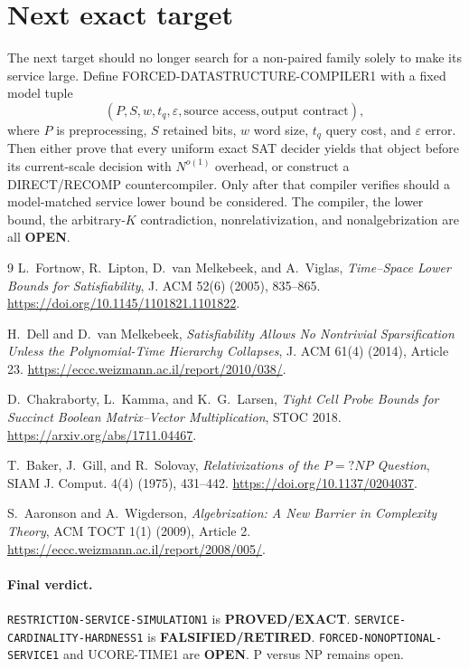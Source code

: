 \documentclass[11pt]{article}
\newcommand{\OPEN}{\textbf{OPEN}}
\newcommand{\EXACT}{\textbf{PROVED/EXACT}}
\newcommand{\RETIRED}{\textbf{FALSIFIED/RETIRED}}
\begin{document}
\section{Next exact target}

The next target should no longer search for a non-paired family solely to make
its service large.  Define \textsf{FORCED-DATASTRUCTURE-COMPILER1} with a fixed
model tuple
\[
(P,S,w,t_q,\varepsilon,\text{source access},\text{output contract}),       \tag{8}
\]
where $P$ is preprocessing, $S$ retained bits, $w$ word size, $t_q$
query cost, and $\varepsilon$ error.  Then either prove that every uniform
exact SAT decider yields that object before its current-scale decision with
$N^{o(1)}$ overhead, or construct a DIRECT/RECOMP countercompiler.  Only
after that compiler verifies should a model-matched service lower bound be
considered.  The compiler, the lower bound, the arbitrary-$K$ contradiction,
nonrelativization, and nonalgebrization are all \OPEN.

\begin{thebibliography}{9}
L.~Fortnow, R.~Lipton, D.~van Melkebeek, and A.~Viglas,
\emph{Time--Space Lower Bounds for Satisfiability}, J. ACM 52(6) (2005),
835--865. \url{https://doi.org/10.1145/1101821.1101822}.

H.~Dell and D.~van Melkebeek,
\emph{Satisfiability Allows No Nontrivial Sparsification Unless the
Polynomial-Time Hierarchy Collapses}, J. ACM 61(4) (2014), Article 23.
\url{https://eccc.weizmann.ac.il/report/2010/038/}.

D.~Chakraborty, L.~Kamma, and K.~G.~Larsen,
\emph{Tight Cell Probe Bounds for Succinct Boolean Matrix--Vector
Multiplication}, STOC 2018.
\url{https://arxiv.org/abs/1711.04467}.

T.~Baker, J.~Gill, and R.~Solovay,
\emph{Relativizations of the $P=?NP$ Question}, SIAM J. Comput. 4(4)
(1975), 431--442. \url{https://doi.org/10.1137/0204037}.

S.~Aaronson and A.~Wigderson,
\emph{Algebrization: A New Barrier in Complexity Theory}, ACM TOCT 1(1)
(2009), Article 2. \url{https://eccc.weizmann.ac.il/report/2008/005/}.
\end{thebibliography}

\paragraph{Final verdict.}
\texttt{RESTRICTION-SERVICE-SIMULATION1} is \EXACT.
\texttt{SERVICE-CARDINALITY-HARDNESS1} is \RETIRED.
\texttt{FORCED-NONOPTIONAL-SERVICE1} and UCORE-TIME1 are \OPEN.
P versus NP remains open.

\end{document}
